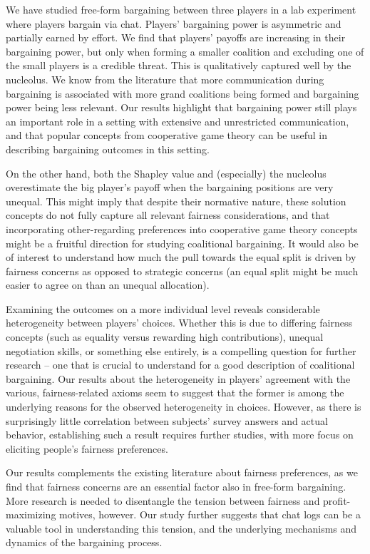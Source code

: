 We have studied free-form bargaining between three players in a lab experiment where players bargain via chat. Players' bargaining power is asymmetric and partially earned by effort. We find that players' payoffs are increasing in their bargaining power, but only when forming a smaller coalition and excluding one of the small players is a credible threat. This is qualitatively captured well by the nucleolus. We know from the literature that more communication during bargaining is associated with more grand coalitions being formed and bargaining power being less relevant. Our results highlight that bargaining power still plays an important role in a setting with extensive and unrestricted communication, and that popular concepts from cooperative game theory can be useful in describing bargaining outcomes in this setting. 

On the other hand, both the Shapley value and (especially) the nucleolus overestimate the big player's payoff when the bargaining positions are very unequal. This might imply that despite their normative nature, these solution concepts do not fully capture all relevant fairness considerations, and that incorporating other-regarding preferences into cooperative game theory concepts might be a fruitful direction for studying coalitional bargaining. It would also be of interest to understand how much the pull towards the equal split is driven by fairness concerns as opposed to strategic concerns (an equal split might be much easier to agree on than an unequal allocation).

Examining the outcomes on a more individual level reveals considerable heterogeneity between players' choices. Whether this is due to differing fairness concepts (such as equality versus rewarding high contributions), unequal negotiation skills, or something else entirely, is a compelling question for further research -- one that is crucial to understand for a good description of coalitional bargaining. Our results about the heterogeneity in players' agreement with the various, fairness-related axioms seem to suggest that the former is among the underlying reasons for the observed heterogeneity in choices. However, as there is surprisingly little correlation between subjects' survey answers and actual behavior, establishing such a result requires further studies, with more focus on eliciting people's fairness preferences.

Our results complements the existing literature about fairness preferences, as we find that fairness concerns are an essential factor also in free-form bargaining. More research is needed to disentangle the tension between fairness and profit-maximizing motives, however. Our study further suggests that chat logs can be a valuable tool in understanding this tension, and the underlying mechanisms and dynamics of the bargaining process.
